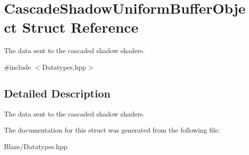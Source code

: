 \hypertarget{structCascadeShadowUniformBufferObject}{}\section{Cascade\+Shadow\+Uniform\+Buffer\+Object Struct Reference}
\label{structCascadeShadowUniformBufferObject}


The data sent to the cascaded shadow shaders.  




{\ttfamily \#include $<$Datatypes.\+hpp$>$}



\subsection{Detailed Description}
The data sent to the cascaded shadow shaders. 

The documentation for this struct was generated from the following file\+:\begin{DoxyCompactItemize}
\item 
Blaze/Datatypes.\+hpp\end{DoxyCompactItemize}
